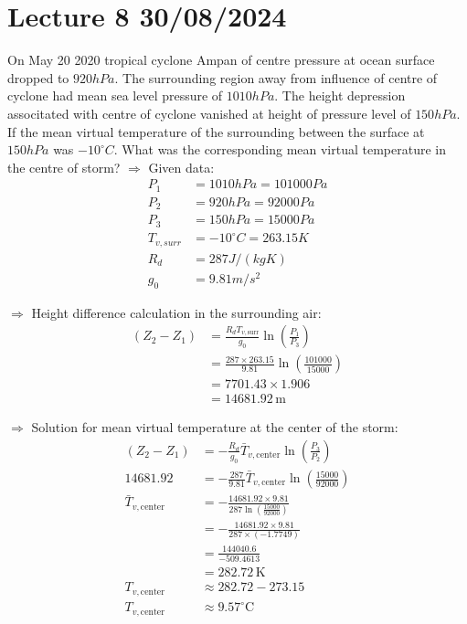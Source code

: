 \documentclass[fleqn,10pt]{SelfArx} %
\begin{document}
\section{Lecture 8 30/08/2024}
\begin{question}[label=q:8.1]{On May 20\text{,} 2020 tropical cyclone Ampan of centre pressure at ocean surface dropped to $920hPa$. The surrounding region away from influence of centre of cyclone had mean sea level pressure of $1010hPa$. The height depression associtated with centre of cyclone vanished at height of pressure level of $150hPa$. If the mean virtual temperature of the surrounding between the surface at $150hPa$ was $-10^{\circ}C$. What was the corresponding mean virtual temperature in the centre of storm?}
    $\Rightarrow$ Given data:
    \begin{align*}
         P_1 &= 1010 hPa = 101000 Pa \\
         P_2 &= 920 hPa = 92000 Pa \\
         P_3 &= 150 hPa = 15000 Pa \\
         T_{v,surr} &= -10^\circ C = 263.15 K \\
         R_d &= 287 J/(kg K) \\
         g_0 &= 9.81 m/s^2
    \end{align*}

    $\Rightarrow$ Height difference calculation in the surrounding air:
    \begin{align*}
        (Z_2 - Z_1) &= \frac{R_d T_{v,\text{surr}}}{g_0} \ln\left(\frac{P_1}{P_3}\right) \\
        &= \frac{287 \times 263.15}{9.81} \ln\left(\frac{101000}{15000}\right) \\
        &= 7701.43 \times 1.906 \\
        &= 14681.92 \, \text{m}
    \end{align*}

    $\Rightarrow$ Solution for mean virtual temperature at the center of the storm:
    \begin{align*}
        (Z_2 - Z_1) &= -\frac{R_d}{g_0} \bar{T}_{v,\text{center}} \ln\left(\frac{P_3}{P_2}\right) \\
        14681.92 &= -\frac{287}{9.81} \bar{T}_{v,\text{center}} \ln\left(\frac{15000}{92000}\right) \\
        \bar{T}_{v,\text{center}} &= -\frac{14681.92 \times 9.81}{287 \ln\left(\frac{15000}{92000}\right)} \\
        &= -\frac{14681.92 \times 9.81}{287 \times (-1.7749)} \\
        &= \frac{144040.6}{-509.4613} \\
        &= 282.72 \, \text{K} \\
        T_{v,\text{center}} &\approx 282.72 - 273.15 \\
        T_{v,\text{center}} &\approx 9.57^\circ \text{C}
    \end{align*}
\end{question}
\end{document}
